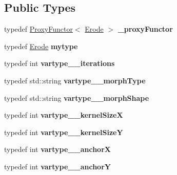 \subsection*{Public Types}
\begin{DoxyCompactItemize}
\item 
\mbox{\label{classfilter_1_1algos_1_1_erode_a0dae564b3f9d318acb9ecf5b967dc295}} 
typedef \hyperlink{class_proxy_functor}{Proxy\+Functor}$<$ \hyperlink{classfilter_1_1algos_1_1_erode}{Erode} $>$ {\bfseries \+\_\+proxy\+Functor}
\item 
\mbox{\label{classfilter_1_1algos_1_1_erode_a315c4dfcad46e0086526a60c892c3d74}} 
typedef \hyperlink{classfilter_1_1algos_1_1_erode}{Erode} {\bfseries mytype}
\item 
\mbox{\label{classfilter_1_1algos_1_1_erode_a24c830675119cb4673b3adbd47d481fc}} 
typedef int {\bfseries vartype\+\_\+\+\_\+iterations}
\item 
\mbox{\label{classfilter_1_1algos_1_1_erode_a63e06d047f04a11eaca2419ae28418ac}} 
typedef std\+::string {\bfseries vartype\+\_\+\+\_\+morph\+Type}
\item 
\mbox{\label{classfilter_1_1algos_1_1_erode_aba2adb9ce2397fc1fae3b0fb5c664f81}} 
typedef std\+::string {\bfseries vartype\+\_\+\+\_\+morph\+Shape}
\item 
\mbox{\label{classfilter_1_1algos_1_1_erode_a402f6f07baab72f5495274d8badf2089}} 
typedef int {\bfseries vartype\+\_\+\+\_\+kernel\+SizeX}
\item 
\mbox{\label{classfilter_1_1algos_1_1_erode_a7848d2eb18420a14fe5ee09242c8c9a5}} 
typedef int {\bfseries vartype\+\_\+\+\_\+kernel\+SizeY}
\item 
\mbox{\label{classfilter_1_1algos_1_1_erode_a2fce3a51dd2b228a242f3c6e2dbc2a0b}} 
typedef int {\bfseries vartype\+\_\+\+\_\+anchorX}
\item 
\mbox{\label{classfilter_1_1algos_1_1_erode_a3d52f0f9da087b31ed4e8fd801b68f7e}} 
typedef int {\bfseries vartype\+\_\+\+\_\+anchorY}
\end{DoxyCompactItemize}
